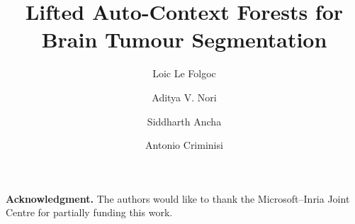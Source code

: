 \documentclass[runningheads,a4paper]{llncs}
\begin{document}
\mainmatter

\title{Lifted Auto-Context Forests for Brain Tumour Segmentation%
}
\titlerunning{Lifted Auto-Context Forests for BRATS%
}

\author{Loic Le Folgoc \and Aditya V. Nori \and Siddharth Ancha \and Antonio Criminisi}

\toctitle{}
\tocauthor{}
\maketitle




\begin{abstract}

\end{abstract}














%



\noindent
\textbf{Acknowledgment.} The authors would like to thank the Microsoft--Inria Joint Centre for partially funding this work.

{\small


}

\appendix
\end{document}
